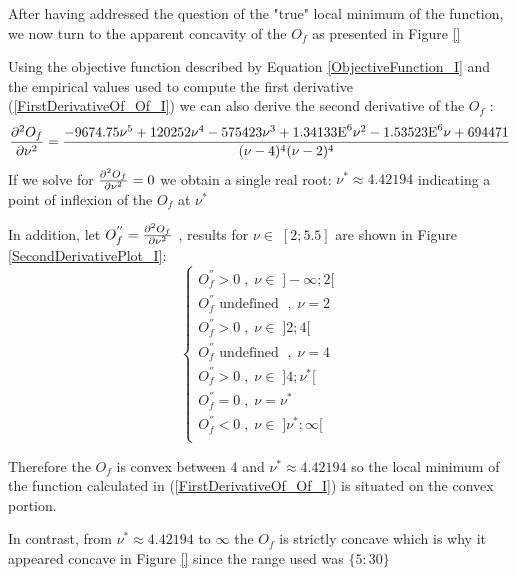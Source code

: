 After having addressed the question of the "true" local minimum of the function, we now turn to the apparent concavity of the $O_f$ as presented in Figure \ref{} \bigskip\par
Using the objective function described by Equation \ref{ObjectiveFunction_I} and the empirical values used to compute the first derivative (\ref{FirstDerivativeOf_Of_I}) we can also derive the second derivative of the $O_f$ :
\begin{equation}\label{SecondDerivativeOf_Of_I}
    \pdv[2]{O_f}{\nu} =  \frac{-9674.75 \nu^5 + 120252 \nu^4 - 575423 \nu^3 + 1.34133\text{E}^6 \nu^2 - 1.53523\text{E}^6 \nu + 694471}{(\nu - 4)^4 (\nu - 2)^4}
\end{equation}
If we solve for $\pdv[2]{O_f}{\nu} = 0$ we obtain a single real root: $\nu^* \approx 4.42194$ indicating a point of inflexion of the $O_f$ at $\nu^*$ 
\smallskip \par
In addition, let $O_f^{''}=\pdv[2]{O_f}{\nu}$ , results for $\nu \in \; [2;5.5]$ are shown in Figure \ref{SecondDerivativePlot_I}:
\begin{equation*}
    \begin{cases}
        O_f^{''} > 0 \; , \; \nu \in \; ]-\infty;2[ \\
        O_f^{''} \text{ undefined } \; , \; \nu = 2 \\
        O_f^{''} > 0 \; , \; \nu \in \; ]2;4[ \\
        O_f^{''} \text{ undefined } \; , \; \nu = 4 \\
        O_f^{''} > 0 \; , \; \nu \in \; ]4;\nu^*[ \\
        O_f^{''} = 0 \; , \; \nu = \nu^* \\
        O_f^{''} < 0 \; , \; \nu \in \; ]\nu^*;\infty[ \\
    \end{cases}
\end{equation*}

Therefore the $O_f$ is convex between $4$ and $\nu^* \approx 4.42194$ so the local minimum of the function calculated in (\ref{FirstDerivativeOf_Of_I}) is situated on the convex portion.
\smallskip\par
In contrast, from $\nu^* \approx 4.42194$ to $\infty$ the $O_f$ is strictly concave which is why it appeared concave in Figure \ref{} since the range used was $\{5:30\}$